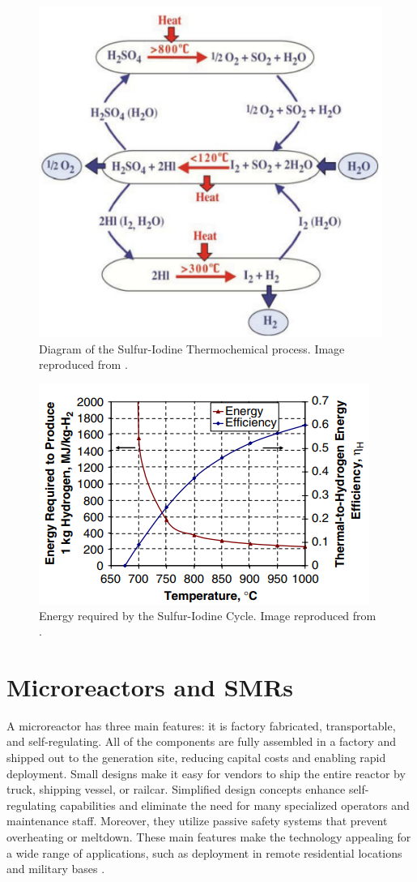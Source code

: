 \documentclass[11pt,letterpaper]{article}
\begin{document}
\begin{figure}[htbp!]
	\centering
	\includegraphics[width=0.5\linewidth]{figures/sulfur1.png}
	\hfill
	\caption{Diagram of the Sulfur-Iodine Thermochemical process. Image reproduced from \cite{benjamin_russ_sulfur_2009}.}
	\label{fig:sulfur1}
\end{figure}

\begin{figure}[htbp!]
	\centering
	\includegraphics[width=0.6\linewidth]{figures/si-energy.png}
	\hfill
	\caption{Energy required by the Sulfur-Iodine Cycle. Image reproduced from \cite{yildiz_efficiency_2006}.}
	\label{fig:sulfur2}
\end{figure}

\section{Microreactors and \glspl{SMR}}
\label{sec:reactors}

A microreactor has three main features: it is factory fabricated, transportable, and self-regulating.
All of the components are fully assembled in a factory and shipped out to the generation site, reducing capital costs and enabling rapid deployment.
Small designs make it easy for vendors to ship the entire reactor by truck, shipping vessel, or railcar.
Simplified design concepts enhance self-regulating capabilities and eliminate the need for many specialized operators and maintenance staff.
Moreover, they utilize passive safety systems that prevent overheating or meltdown.
These main features make the technology appealing for a wide range of applications, such as deployment in remote residential locations and military bases \cite{us-doe_ultimate_2019}.
\end{document}
